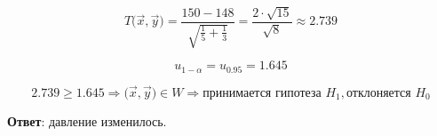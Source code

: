 \begin{equation*}
    T\big( \vec x, \vec y \big) = \frac{150 - 148}{\sqrt{\frac{1}{5} + \frac{1}{3}}} = \frac{2 \cdot \sqrt{15}}{\sqrt{8}} \approx 2.739
\end{equation*}

\begin{equation*}
    u_{1- \alpha} = u_{0.95} = 1.645
\end{equation*}

\begin{equation*}
    2.739 \geq 1.645 \Rightarrow \big( \vec x, \vec y \big) \in W \Rightarrow \text{принимается гипотеза } H_1, \text{отклоняется } H_0
\end{equation*}

\textbf{Ответ}: давление изменилось.
